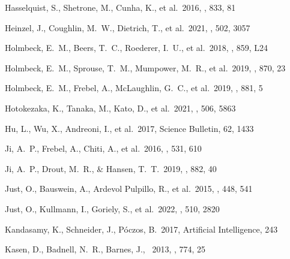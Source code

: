 \documentclass[twocolumn, twocolappendix]{aastex63}
\begin{document}
\begin{thebibliography}{}
 Hasselquist, S., Shetrone, M., Cunha, K., et al.\ 2016, \apj, 833, 81


 Heinzel, J., Coughlin, M.~W., Dietrich, T., et al.\ 2021, \mnras, 502, 3057


 Holmbeck, E.~M., Beers, T.~C., Roederer, I.~U., et al.\ 2018, \apjl, 859, L24


 Holmbeck, E.~M., Sprouse, T.~M., Mumpower, M.~R., et al.\ 2019, \apj, 870, 23


 Holmbeck, E.~M., Frebel, A., McLaughlin, G.~C., et al.\ 2019, \apj, 881, 5


 Hotokezaka, K., Tanaka, M., Kato, D., et al.\ 2021, \mnras, 506, 5863


 Hu, L., Wu, X., Andreoni, I., et al.\ 2017, Science Bulletin, 62, 1433




 Ji, A.~P., Frebel, A., Chiti, A., et al.\ 2016, \nat, 531, 610


 Ji, A.~P., Drout, M.~R., \& Hansen, T.~T.\ 2019, \apj, 882, 40


 Just, O., Bauswein, A., Ardevol Pulpillo, R., et al.\ 2015, \mnras, 448, 541


 Just, O., Kullmann, I., Goriely, S., et al.\ 2022, \mnras, 510, 2820


 Kandasamy, K., Schneider, J., P{\'o}czos, B.\ 2017, Artificial Intelligence, 243




Kasen, D., Badnell, N.~R., Barnes, J., \ 2013, \aj, 774, 25



\end{thebibliography}
\end{document}
